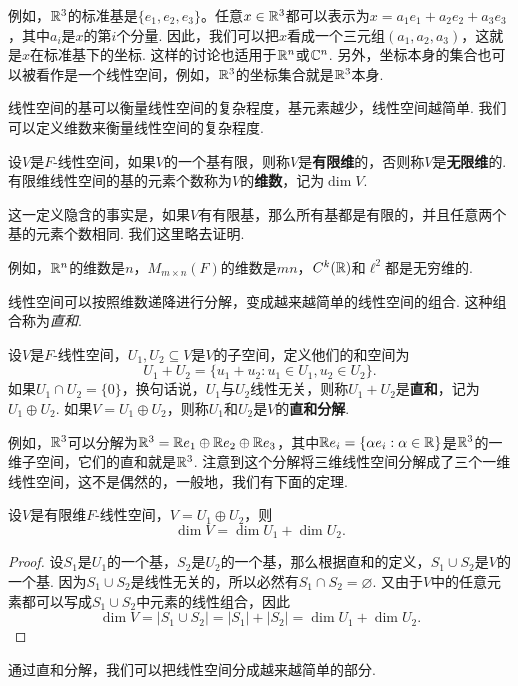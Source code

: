 例如，$\mathbb{R}^3$的标准基是$\{e_1,e_2,e_3\}$。任意$x\in\mathbb{R}^3$都可以表示为$x=a_1e_1+a_2e_2+a_3e_3$，其中$a_i$是$x$的第$i$个分量. 因此，我们可以把$x$看成一个三元组$(a_1,a_2,a_3)$，这就是$x$在标准基下的坐标. 这样的讨论也适用于$\mathbb{R}^n$或$\mathbb{C}^n$. 另外，坐标本身的集合也可以被看作是一个线性空间，例如，$\mathbb{R}^3$的坐标集合就是$\mathbb{R}^3$本身. 

线性空间的基可以衡量线性空间的复杂程度，基元素越少，线性空间越简单. 我们可以定义维数来衡量线性空间的复杂程度. 

\begin{definition}[维数]
设$V$是$F$-线性空间，如果$V$的一个基有限，则称$V$是\textbf{有限维}的，否则称$V$是\textbf{无限维}的. 有限维线性空间的基的元素个数称为$V$的\textbf{维数}，记为$\dim V$. 
\end{definition}

这一定义隐含的事实是，如果$V$有有限基，那么所有基都是有限的，并且任意两个基的元素个数相同. 我们这里略去证明. 

例如，$\mathbb{R}^n$的维数是$n$，$M_{m\times n}(F)$的维数是$mn$，$C^k(\mathbb{R})$和$\ell^2$都是无穷维的. 

线性空间可以按照维数递降进行分解，变成越来越简单的线性空间的组合. 这种组合称为\emph{直和}. 

\begin{definition}[和空间与直和]
设$V$是$F$-线性空间，$U_1,U_2\subseteq V$是$V$的子空间，定义他们的和空间为
\[
    U_1+U_2=\{u_1+u_2:u_1\in U_1,u_2\in U_2\}.
\]
如果$U_1\cap U_2=\{0\}$，换句话说，$U_1$与$U_2$线性无关，则称$U_1+U_2$是\textbf{直和}，记为$U_1\oplus U_2$. 如果$V=U_1\oplus U_2$，则称$U_1$和$U_2$是$V$的\textbf{直和分解}. 
\end{definition}

例如，$\mathbb{R}^3$可以分解为$\mathbb{R}^3=\mathbb{R} e_1\oplus \mathbb{R} e_2\oplus \mathbb{R} e_3$，其中$\mathbb{R} e_i=\{\alpha e_i:\alpha\in\mathbb{R}\}$是$\mathbb{R}^3$的一维子空间，它们的直和就是$\mathbb{R}^3$. 注意到这个分解将三维线性空间分解成了三个一维线性空间，这不是偶然的，一般地，我们有下面的定理. 

\begin{theorem}[维数定理]\label{thm:dim-thm}
设$V$是有限维$F$-线性空间，$V=U_1\oplus U_2$，则
\[
    \dim V=\dim U_1+\dim U_2.
\]
\end{theorem}
\begin{proof}
    设$S_1$是$U_1$的一个基，$S_2$是$U_2$的一个基，那么根据直和的定义，$S_1\cup S_2$是$V$的一个基. 因为$S_1\cup S_2$是线性无关的，所以必然有$S_1\cap S_2=\varnothing$. 又由于$V$中的任意元素都可以写成$S_1\cup S_2$中元素的线性组合，因此
    \[
        \dim V=|S_1\cup S_2|=|S_1|+|S_2|=\dim U_1+\dim U_2.
    \]
\end{proof}
通过直和分解，我们可以把线性空间分成越来越简单的部分. 

